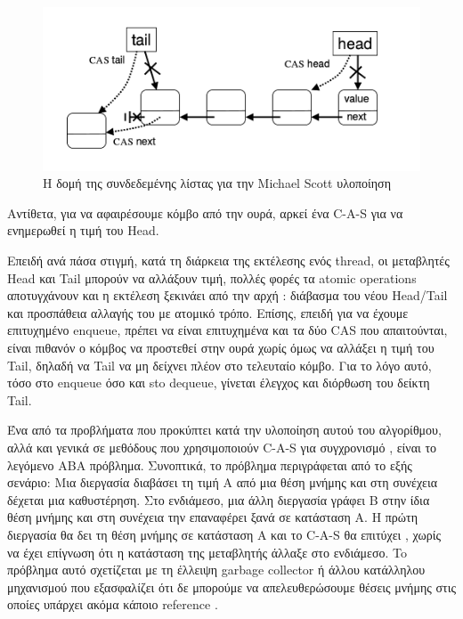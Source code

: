 \begin{figure}
 \centering
  \includegraphics[scale=0.4]{msqueue_struct.png}
\caption{ Η δομή της συνδεδεμένης λίστας για την \textlatin{Michael Scott} υλοποίηση}
\end{figure}


Αντίθετα, για να αφαιρέσουμε κόμβο από την ουρά, αρκεί ένα \textlatin{C-A-S}  για να ενημερωθεί η τιμή του \textlatin{Head}.


Επειδή ανά πάσα στιγμή, κατά τη διάρκεια της εκτέλεσης ενός \textlatin{thread}, οι μεταβλητές \textlatin{Head} και \textlatin{Tail} μπορούν να αλλάξουν τιμή, πολλές φορές τα \textlatin{atomic operations} αποτυγχάνουν και η εκτέλεση ξεκινάει από την αρχή : διάβασμα του νέου \textlatin{Head/Tail} και προσπάθεια αλλαγής του με ατομικό τρόπο. Επίσης, επειδή για να έχουμε επιτυχημένο \textlatin{enqueue}, πρέπει να είναι επιτυχημένα και τα δύο \textlatin{CAS} που απαιτούνται, είναι πιθανόν ο κόμβος να προστεθεί στην ουρά χωρίς όμως να αλλάξει η τιμή του \textlatin{Tail}, δηλαδή να \textlatin{Tail} να μη δείχνει πλέον στο τελευταίο κόμβο. Για το λόγο αυτό, τόσο στο \textlatin{enqueue} όσο και sto \textlatin{dequeue}, γίνεται έλεγχος και διόρθωση του δείκτη \textlatin{Tail}.

Ένα από τα προβλήματα που προκύπτει κατά την υλοποίηση αυτού του αλγορίθμου, αλλά και γενικά σε μεθόδους που χρησιμοποιούν \textlatin{C-A-S} για συγχρονισμό , είναι το λεγόμενο ABA πρόβλημα. Συνοπτικά, το πρόβλημα περιγράφεται από το εξής σενάριο: Μια διεργασία διαβάσει τη τιμή Α από μια θέση μνήμης και στη συνέχεια  δέχεται μια καθυστέρηση. Στο ενδιάμεσο, μια άλλη διεργασία γράφει Β στην ίδια θέση μνήμης και στη συνέχεια την επαναφέρει ξανά σε κατάσταση Α. Η πρώτη διεργασία θα δει τη θέση μνήμης σε κατάσταση Α και το \textlatin{C-A-S} θα επιτύχει , χωρίς να έχει επίγνωση ότι η κατάσταση της μεταβλητής άλλαξε στο ενδιάμεσο. To πρόβλημα αυτό σχετίζεται με τη έλλειψη \textlatin{garbage collector} ή άλλου κατάλληλου μηχανισμού που εξασφαλίζει ότι δε μπορούμε να απελευθερώσουμε θέσεις μνήμης στις οποίες υπάρχει ακόμα κάποιο \textlatin{reference} .


